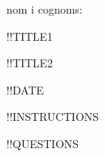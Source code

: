 \documentclass[12pt]{extarticle}
\begin{document}
\vspace{-0.7cm}
\singlespacing
\normalsize
nom i cognoms: 
\begin{center}
\singlespacing
\large
\vspace{-1cm}
!!TITLE1

!!TITLE2

\normalsize
!!DATE
\end{center}	
\singlespacing
\small
\vspace{-1cm}
!!INSTRUCTIONS
\begin{enumerate}[noitemsep]
\small

!!QUESTIONS
 
\end{enumerate}
\end{document}
